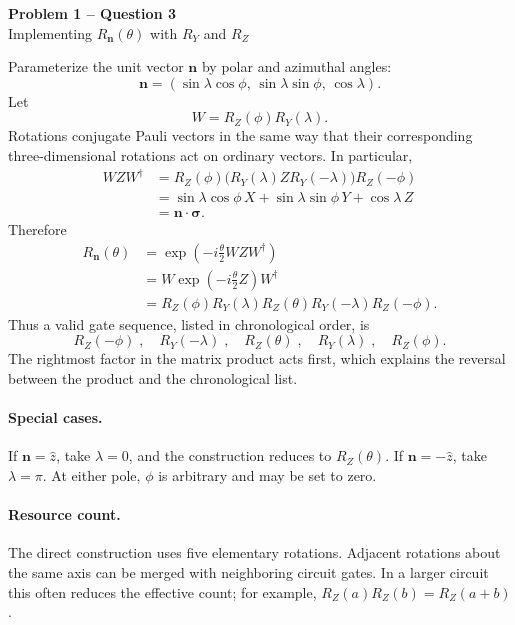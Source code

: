 \documentclass[11pt]{article}
\begin{document}
\begin{center}
  {\Large\bfseries Problem 1 -- Question 3}\\[0.3em]
  {\large Implementing \(R_{\mathbf n}(\theta)\) with \(R_Y\) and \(R_Z\)}
\end{center}

Parameterize the unit vector \(\mathbf n\) by polar and azimuthal angles:
\[
 \mathbf n
 =(\sin\lambda\cos\phi,\,
   \sin\lambda\sin\phi,\,
   \cos\lambda).
\]
Let
\[
 W=R_Z(\phi)R_Y(\lambda).
\]
Rotations conjugate Pauli vectors in the same way that their corresponding
three-dimensional rotations act on ordinary vectors. In particular,
\begin{align*}
 WZW^\dagger
 &=R_Z(\phi)
   \bigl(R_Y(\lambda)ZR_Y(-\lambda)\bigr)
   R_Z(-\phi)\\
 &=\sin\lambda\cos\phi\,X
  +\sin\lambda\sin\phi\,Y
  +\cos\lambda\,Z\\
 &=\mathbf n\cdot\boldsymbol{\sigma}.
\end{align*}
Therefore
\begin{align*}
 R_{\mathbf n}(\theta)
 &=\exp\left(-i\frac{\theta}{2}WZW^\dagger\right)\\
 &=W\exp\left(-i\frac{\theta}{2}Z\right)W^\dagger\\
 &=R_Z(\phi)R_Y(\lambda)R_Z(\theta)
   R_Y(-\lambda)R_Z(-\phi).
\end{align*}
Thus a valid gate sequence, listed in chronological order, is
\[
\boxed{
R_Z(-\phi)\;,\quad
R_Y(-\lambda)\;,\quad
R_Z(\theta)\;,\quad
R_Y(\lambda)\;,\quad
R_Z(\phi).
}
\]
The rightmost factor in the matrix product acts first, which explains the
reversal between the product and the chronological list.

\paragraph{Special cases.}
If \(\mathbf n=\hat z\), take \(\lambda=0\), and the construction reduces
to \(R_Z(\theta)\). If \(\mathbf n=-\hat z\), take \(\lambda=\pi\).
At either pole, \(\phi\) is arbitrary and may be set to zero.

\paragraph{Resource count.}
The direct construction uses five elementary rotations. Adjacent rotations
about the same axis can be merged with neighboring circuit gates. In a
larger circuit this often reduces the effective count; for example,
\(R_Z(a)R_Z(b)=R_Z(a+b)\).
\end{document}
